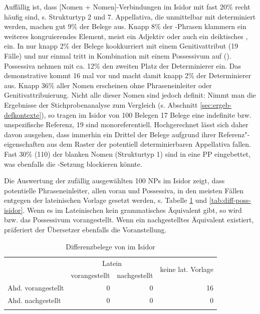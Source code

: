 Auffällig ist, dass [Nomen + Nomen]-Verbindungen im Isidor mit fast 20\% recht häufig sind, s. Strukturtyp 2 und 7. Appellativa, die unmittelbar mit  determiniert werden, machen gut 9\% der Belege aus. Knapp 8\% der -Phrasen klammern ein weiteres kongruierendes Element, meist ein Adjektiv oder auch ein deiktisches , ein. In nur knapp 2\% der Belege kookkurriert  mit einem Genitivattribut (19 Fälle) und nur einmal tritt  in Kombination mit einem Possessivum auf (). Possessiva  nehmen mit ca. 12\% den zweiten Platz der Determinierer ein. Das demonstrative  kommt 16 mal vor und macht damit  knapp 2\% der Determinierer aus. Knapp 36\% aller Nomen erscheinen ohne Phraseneinleiter oder Genitivattribuierung. Nicht alle dieser Nomen sind jedoch definit:  Nimmt man die Ergebnisse der Stichprobenanalyse zum Vergleich (s. Abschnitt \ref{sec:ergeb-defkontexte}), so tragen im Isidor von 100 Belegen 17 Belege eine indefinite bzw. unspezifische Referenz, 19 sind monoreferentiell. Hochgerechnet lässt sich daher davon ausgehen, dass immerhin ein Drittel der Belege aufgrund ihrer Referenz"-eigenschaften aus dem Raster der potentiell determinierbaren Appellativa fallen. Fast 30\% (110) der blanken Nomen (Strukturtyp 1) sind in eine PP eingebettet, was ebenfalls die -Setzung blockieren könnte. 

Die Auswertung der zufällig ausgewählten 100 NPs im Isidor zeigt, dass potentielle Phraseneinleiter, allen voran  und Possessiva, in den meisten Fällen entgegen der lateinischen Vorlage gesetzt werden, s. Tabelle \ref{tab:diff-ther-isidor} und \ref{tab:diff-poss-isidor}. Wenn es im Lateinischen kein grammatisches Äquivalent gibt, so wird  bzw. das Possessivum vorangestellt. Wenn ein nachgestelltes Äquivalent existiert, präferiert der Übersetzer ebenfalls die Voranstellung.

\begin{table}
\centering
\begin{tabular}{lrrr}
\lsptoprule
                   & \multicolumn{2}{c}{Latein} & \multirow{2}{*}{keine lat. Vorlage}\\
 \cmidrule(lr){2-3}
                   & vorangestellt & nachgestellt & \\ \midrule
Ahd. vorangestellt & 0                  & 0                 & 16                    \\
Ahd. nachgestellt  & 0                  & 0                 & 0                    \\ \lspbottomrule
\end{tabular}
\caption{Differenzbelege von  im Isidor}
\label{tab:diff-ther-isidor}
\end{table}

